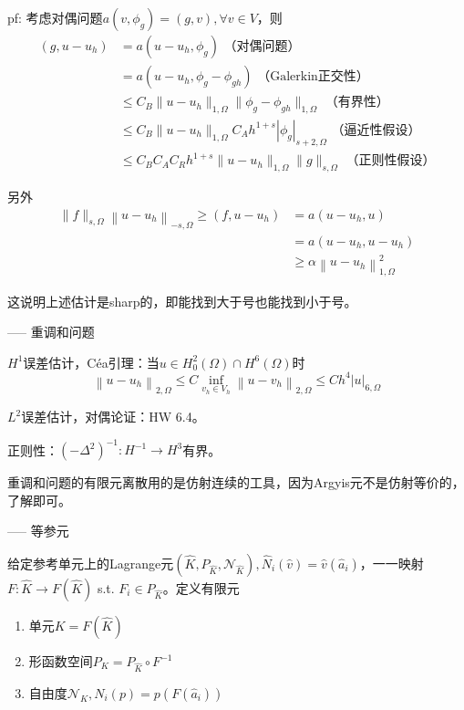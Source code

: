 pf: 考虑对偶问题$a(v, \phi_g) = (g, v), \forall v \in V$，则
\[
  \begin{aligned}
    (g, u - u_h) &= a(u - u_h, \phi_g) \text{ （对偶问题）}\\
    &= a(u - u_h, \phi_g - \phi_{gh}) \text{ （Galerkin正交性）}\\
    &\le C_B \|u - u_h\|_{1, \Omega} \|\phi_g - \phi_{gh}\|_{1, \Omega} \text{ （有界性）}\\
    &\le C_B \|u - u_h\|_{1, \Omega} C_A h^{1 + s} |\phi_g|_{s + 2, \Omega} \text{ （逼近性假设）}\\
    &\le C_B C_A C_R h^{1 + s} \|u - u_h\|_{1, \Omega} \|g\|_{s, \Omega} \text{ （正则性假设）}
  \end{aligned}
\]

另外
\[
  \begin{aligned}
    \|f\|_{s, \Omega} \left\|u-u_{h}\right\|_{-s, \Omega} \ge (f, u - u_h) &= a(u - u_h, u)\\
    &= a(u - u_h, u - u_h)\\
    &\ge \alpha \left\|u-u_{h}\right\|_{1, \Omega}^{2}
  \end{aligned}
\]

这说明上述估计是sharp的，即能找到大于号也能找到小于号。

----- 重调和问题

$H^1$误差估计，Céa引理：当$u \in H_{0}^{2}(\Omega) \cap H^{6}(\Omega)$时
\[
  \left\|u-u_{h}\right\|_{2, \Omega} \leq C \inf _{v_{h} \in V_{h}}\left\|u-v_{h}\right\|_{2, \Omega} \leq C h^{4}|u|_{6, \Omega}
\]

$L^2$误差估计，对偶论证：HW 6.4。

正则性：$(-\Delta^2)^{-1}: H^{-1} \to H^3$有界。

重调和问题的有限元离散用的是仿射连续的工具，因为Argyis元不是仿射等价的，了解即可。

----- 等参元

给定参考单元上的Lagrange元$(\widehat{K}, P_{\widehat{K}}, \mathcal{N}_{\widehat{K}}), \widehat{N}_i(\widehat{v}) = \widehat{v}(\widehat{a}_i)$，一一映射$F: \widehat{K} \to F(\widehat{K})$ s.t. $F_i \in P_{\widehat{K}}$。定义有限元
\begin{enumerate}
  \item 单元$K = F(\widehat{K})$
  \item 形函数空间$P_K = P_{\widehat{K}} \circ F^{-1}$
  \item 自由度$\mathcal{N}_K, N_i(p) = p(F(\widehat{a}_i))$
\end{enumerate}


